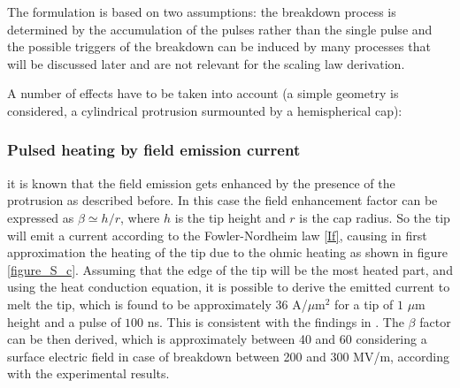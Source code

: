 The formulation is based on two assumptions: the breakdown process is determined by the accumulation of the pulses rather than the single pulse and the possible triggers of the breakdown can be induced by many processes that will be discussed later and are not relevant for the scaling law derivation.

A number of effects have to be taken into account (a simple geometry is considered, a cylindrical protrusion surmounted by a hemispherical  cap): 

\subsubsection{Pulsed heating by field emission current}

it is known that the field emission gets enhanced by the presence of the protrusion as described before. In this case the field enhancement factor can be expressed as $\beta \simeq h/r$, where $h$ is the tip height and $r$ is the cap radius. So the tip will emit a current according to the Fowler-Nordheim law \ref{If}, causing in first approximation the heating of the tip due to the ohmic heating as shown in figure \ref{figure_S_c}. Assuming that the edge of the tip will be the most heated part, and using the heat conduction equation, it is possible to derive the emitted current to melt the tip, which is found to be approximately $36$ A/$\mu$m$^2$ for a tip of $1$  $\mu$m height and a pulse of $100$ ns. This is consistent with the findings in \cite{soviet:1983}. The $\beta$ factor can be then derived, which is approximately between 40 and 60 considering a surface electric field in case of breakdown between 200 and $300$ MV/m, according with the experimental results.


